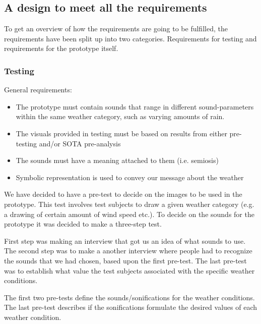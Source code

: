 \subsection{A design to meet all the requirements} %
\label{sub:a_design_to_meet_all_the_requirements}

To get an overview of how the requirements are going to be fulfilled, the requirements have been split up into two categories. Requirements for testing and requirements for the prototype itself.

\subsubsection{Testing} %
\label{ssub:testing}

General requirements:

\begin{itemize}
    \item The prototype must contain sounds that range in different sound-parameters within the same weather category, such as varying amounts of rain.
    \item The visuals provided in testing must be based on results from either pre-testing and/or SOTA pre-analysis
    \item The sounds must have a meaning attached to them (i.e. semiosis)
    \item Symbolic representation is used to convey our message about the weather
\end{itemize}

We have decided to have a pre-test to decide on the images to be used in the prototype. 
This test involves test subjects to draw a given weather category (e.g. a drawing of certain amount of wind speed etc.). 
To decide on the sounds for the prototype it was decided to make a three-step test. 

First step was making an interview that got us an idea of what sounds to use. 
The second step was to make a another interview where people had to recognize the sounds that we had chosen, based upon the first pre-test. 
The last pre-test was to establish what value the test subjects associated with the specific weather conditions. 

The first two pre-tests define the sounds/sonifications for the weather conditions. 
The last pre-test describes if the sonifications formulate the desired values of each weather condition.



